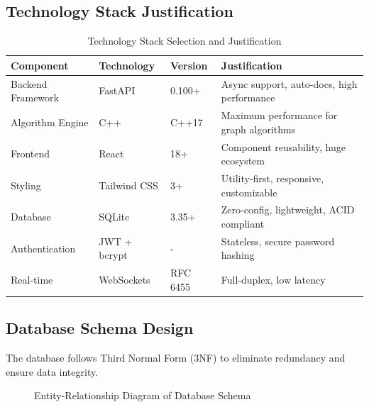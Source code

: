 \documentclass[12pt,a4paper]{article}
\begin{document}
\subsection{Technology Stack Justification}

\begin{table}[H]
\centering
\caption{Technology Stack Selection and Justification}
\label{tab:tech_stack}
\begin{tabular}{|l|l|l|p{5cm}|}
\hline
\textbf{Component} & \textbf{Technology} & \textbf{Version} & \textbf{Justification} \\ \hline
Backend Framework & FastAPI & 0.100+ & Async support, auto-docs, high performance \\ \hline
Algorithm Engine & C++ & C++17 & Maximum performance for graph algorithms \\ \hline
Frontend & React & 18+ & Component reusability, huge ecosystem \\ \hline
Styling & Tailwind CSS & 3+ & Utility-first, responsive, customizable \\ \hline
Database & SQLite & 3.35+ & Zero-config, lightweight, ACID compliant \\ \hline
Authentication & JWT + bcrypt & - & Stateless, secure password hashing \\ \hline
Real-time & WebSockets & RFC 6455 & Full-duplex, low latency \\ \hline
\end{tabular}
\end{table}

\subsection{Database Schema Design}
The database follows Third Normal Form (3NF) to eliminate redundancy and ensure data integrity.

\begin{figure}[H]
    \centering
    \caption{Entity-Relationship Diagram of Database Schema}
    \label{fig:er_diagram}
\end{figure}
\end{document}
